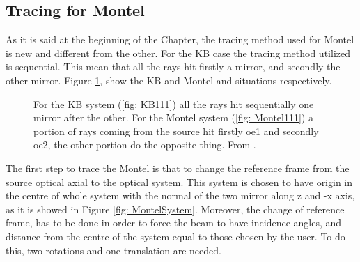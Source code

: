 \subsection{Tracing for Montel}
As it is said at the beginning of the Chapter, the tracing method used for Montel is new and different from the other. For the KB case the tracing method utilized is sequential. This mean that all the rays hit firstly a mirror, and secondly the other mirror. Figure \ref{fig : 111}, show the KB and Montel and situations respectively.
\begin{figure}[H]
%
\centering
%
\quad
%
%
\caption{For the KB system (\ref{fig: KB111}) all the rays hit sequentially one mirror after the other. For the Montel system (\ref{fig: Montel111}) a portion of rays coming from the source hit firstly oe1 and secondly oe2, the other portion do the opposite thing. From \cite{liu2011achromatic}.}
\label{fig : 111}
%
\end{figure}
\noindent The first step to trace the Montel is that to change the reference frame from the source optical axial to the optical system. This system is chosen to have origin in the centre  of whole system with the normal of the two mirror along z and -x axis, as it is showed in Figure \ref{fig: MontelSystem}. Moreover, the change of reference frame, has to be done in order to force the beam to have incidence angles, and distance from the centre  of the system equal to those chosen by the user. To do this, two rotations and one translation are needed.
\\

